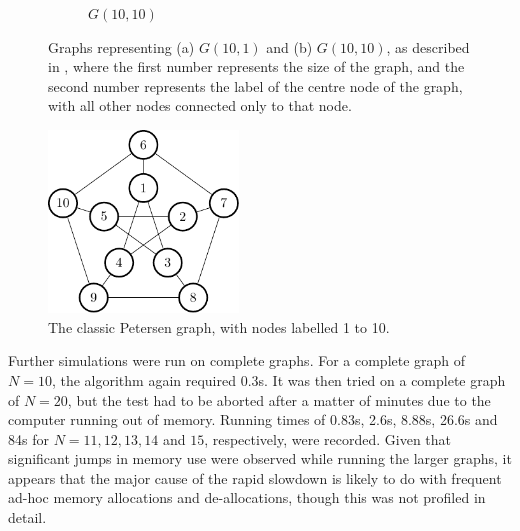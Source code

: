 \begin{figure}
\begin{subfigure}[b]{0.35\textwidth}
        \caption{\label{fig:gcol:g-10-10}\(G(10,10)\)}
    \end{subfigure}
    \caption[Graphs representing \(G(10,1)\) and \(G(10,10)\)]{\label{fig:gcol:gs}Graphs representing (a) \(G(10,1)\) and (b) \(G(10,10)\), as described in \cite{Gheorghe2013}, where the first number represents the size of the graph, and the second number represents the label of the centre node of the graph, with all other nodes connected only to that node.}
\end{figure}

\begin{figure}
    \centering
    \includegraphics[width=0.45\textwidth]{chapters/gcol/figs/petersen-figure0.pdf}
    \caption[The Petersen Graph]{\label{fig:gcol:petersen}The classic Petersen graph, with nodes labelled 1 to 10.}
\end{figure}

Further simulations were run on complete graphs.  For a complete graph of \(N = 10\), the algorithm again required 0.3s.  It was then tried on a complete graph of \(N = 20\), but the test had to be aborted after a matter of minutes due to the computer running out of memory.  Running times of 0.83s, 2.6s, 8.88s, 26.6s and 84s for \(N = 11, 12, 13, 14\) and \(15\), respectively, were recorded.  Given that significant jumps in memory use were observed while running the larger graphs, it appears that the major cause of the rapid slowdown is likely to do with frequent ad-hoc memory allocations and de-allocations, though this was not profiled in detail.


